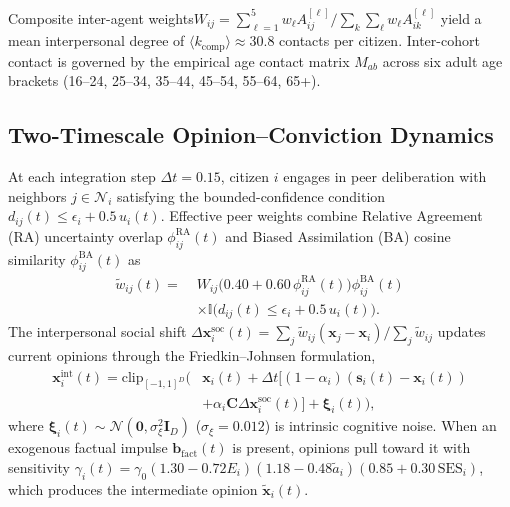 \documentclass[a4paper,fleqn]{cas-dc}
\begin{document}
Composite inter-agent weights\linebreak $W_{ij} = \sum_{\ell=1}^5 w_\ell A_{ij}^{[\ell]} \big/ \sum_k \sum_\ell w_\ell A_{ik}^{[\ell]}$ yield a mean interpersonal degree of $\langle k_{\mathrm{comp}} \rangle \approx 30.8$ contacts per citizen. Inter-cohort contact is governed by the empirical age contact matrix $M_{ab}$ across six adult age brackets (16--24, 25--34, 35--44, 45--54, 55--64, 65+).

\subsection{Two-Timescale Opinion--Conviction Dynamics}
\label{subsec:opinion_dynamics}
At each integration step $\Delta t = 0.15$, citizen $i$ engages in peer deliberation with neighbors $j \in \mathcal{N}_i$ satisfying the bounded-confidence condition $d_{ij}(t) \le \epsilon_i + 0.5\,u_i(t)$. Effective peer weights combine Relative Agreement (RA) uncertainty overlap $\phi_{ij}^{\mathrm{RA}}(t)$ and Biased Assimilation (BA) cosine similarity $\phi_{ij}^{\mathrm{BA}}(t)$ as
\begin{equation}
\begin{aligned}
    \tilde{w}_{ij}(t) = \; & W_{ij} \big(0.40 + 0.60\,\phi_{ij}^{\mathrm{RA}}(t)\big) \phi_{ij}^{\mathrm{BA}}(t) \\
    & \times \mathbb{I}\!\big(d_{ij}(t) \le \epsilon_i + 0.5\,u_i(t)\big).
\end{aligned}
\label{eq:methods_peer_weight}
\end{equation}
The interpersonal social shift $\Delta \mathbf{x}_i^{\mathrm{soc}}(t) = \sum_{j} \tilde{w}_{ij}(\mathbf{x}_j - \mathbf{x}_i) / \sum_j \tilde{w}_{ij}$ updates current opinions through the Friedkin--Johnsen formulation,
\begin{equation}
\begin{aligned}
    \mathbf{x}_i^{\mathrm{int}}(t) = \mathrm{clip}_{[-1, 1]^D}\!\Big(& \mathbf{x}_i(t) + \Delta t \big[(1 - \alpha_i)(\mathbf{s}_i(t) - \mathbf{x}_i(t)) \\
    & + \alpha_i \mathbf{C}\Delta \mathbf{x}_i^{\mathrm{soc}}(t)\big] + \boldsymbol{\xi}_i(t)\Big),
\end{aligned}
\label{eq:methods_fj}
\end{equation}
where $\boldsymbol{\xi}_i(t) \sim \mathcal{N}(\mathbf{0}, \sigma_{\xi}^2 \mathbf{I}_D)$ ($\sigma_{\xi} = 0.012$) is intrinsic cognitive noise. When an exogenous factual impulse $\mathbf{b}_{\mathrm{fact}}(t)$ is present, opinions pull toward it with sensitivity $\gamma_i(t) = \gamma_0 (1.30 - 0.72 E_i)(1.18 - 0.48\tilde{a}_i)(0.85 + 0.30\,\mathrm{SES}_i)$, which produces the intermediate opinion $\tilde{\mathbf{x}}_i(t)$.
\end{document}
